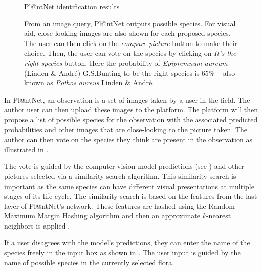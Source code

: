 \begin{figure}[H]
\begin{minipage}[b]{0.55\textwidth}
            \caption*{Pl@ntNet identification results}
        \end{minipage}
        \caption{From an image query, Pl@ntNet outputs possible species. For visual aid, close-looking images are also shown for each proposed species. The user can then click on the \emph{compare picture} button to make their choice. Then, the user can vote on the species by clicking on \emph{It's the right species} button. Here the probability of \emph{Epipremnum aureum} (Linden \& André) G.S.Bunting to be the right species is $65\%$ -- also known as \emph{Pothos aureus} Linden \& André.}
        \label{fig:pothos_id}
\end{figure}

In Pl@ntNet, an observation is a set of images taken by a user in the field.
The author user can then upload these images to the platform.
The platform will then propose a list of possible species for the observation with the associated predicted probabilities and other images that are close-looking to the picture taken.
The author can then vote on the species they think are present in the observation as illustrated in .

The vote is guided by the computer vision model predictions (see ) and other pictures selected via a similarity search algorithm.
This similarity search is important as the same species can have different visual presentations at multiple stages of its life cycle.
The similarity search is based on the features from the last layer of Pl@ntNet's network.
These features are hashed using the Random Maximum Margin Hashing algorithm \citep{joly2011random} and then an approximate $k$-nearest neighbors is applied \citep{joly2008posteriori}.

If a user disagrees with the model's predictions, they can enter the name of the species freely in the input box as shown in .
The user input is guided by the name of possible species in the currently selected flora.

